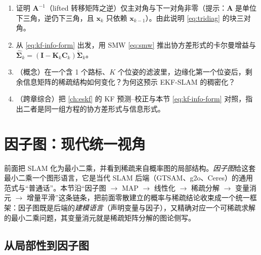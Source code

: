 \begin{practice}
\begin{enumerate}
  \item 证明 $\mathbf{A}^{-1}$（lifted 转移矩阵之逆）仅主对角与下一对角非零（提示：$\mathbf{A}$ 是单位下三角，逆仍下三角，且 $\mathbf{x}_k$ 只依赖 $\mathbf{x}_{k-1}$）。由此说明 \cref{eq:tridiag} 的块三对角。
  \item 从 \cref{eq:kf-info-form} 出发，用 SMW \cref{eq:smw} 推出协方差形式的卡尔曼增益与 $\hat{\boldsymbol{\Sigma}}_k=(\mathbf{I}-\mathbf{K}_k\mathbf{C}_k)\check{\boldsymbol{\Sigma}}_k$。
  \item （概念）在一个含 1 个路标、$K$ 个位姿的滤波里，边缘化第一个位姿后，剩余信息矩阵的稀疏结构如何变化？为何这预示 EKF-SLAM 的稠密化？
  \item （跨章综合）把 \cref{ch:eskf} 的 KF 预测–校正与本节 \cref{eq:kf-info-form} 对照，指出二者是同一组方程的协方差形式与信息形式。
\end{enumerate}
\end{practice}

\section{因子图：现代统一视角}
\label{sec:est-fg}

前面把 SLAM 化为最小二乘，并看到稀疏来自概率图的局部结构。\emph{因子图}给这套最小二乘一个图形语言，它是当代 SLAM 后端（GTSAM、g2o、Ceres）的通用范式与“普通话”\cite{dellaert2017factor,carlone2026handbook}。本节沿“因子图 $\to$ MAP $\to$ 线性化 $\to$ 稀疏分解 $\to$ 变量消元 $\to$ 增量平滑”这条链条，把前面零散建立的概率与稀疏结论收束成一个统一框架：因子图既是后端的\emph{建模语言}（声明变量与因子），又精确对应一个可稀疏求解的最小二乘问题，其变量消元就是稀疏矩阵分解的图论侧写。

\subsection{从局部性到因子图}
\label{sec:est-fg-def}

